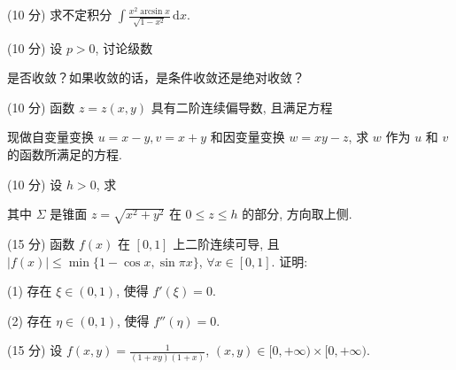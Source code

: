 (10 分) 求不定积分 $\int \frac{x^2 \arcsin x}{\sqrt{1 - x^2}} \, \mathrm{d}x$.\par
\par{}
(10 分) 设 $p > 0$, 讨论级数\par
\nopagebreak[4]
是否收敛？如果收敛的话，是条件收敛还是绝对收敛？\par
\par{}
(10 分) 函数 $z = z(x, y)$ 具有二阶连续偏导数, 且满足方程\par
\nopagebreak[4]
现做自变量变换 $u = x - y, v = x + y$ 和因变量变换 $w = xy - z$, 求 $w$ 作为 $u$ 和 $v$ 的函数所满足的方程.\par
\par{}
(10 分) 设 $h > 0$, 求\par
\nopagebreak[4]
其中 $\Sigma$ 是锥面 $z = \sqrt{x^2 + y^2}$ 在 $0 \leq z \leq h$ 的部分, 方向取上侧.\par
(15 分) 函数 $f(x)$ 在 $[0,1]$ 上二阶连续可导, 且 $|f(x)| \leq \min \{1 - \cos x, \sin \pi x\}$, $\forall x \in [0,1]$. 证明:\par
(1) 存在 $\xi \in (0,1)$, 使得 $f'(\xi) = 0$.\par
(2) 存在 $\eta \in (0,1)$, 使得 $f''(\eta) = 0$.\par
(15 分) 设 $f(x, y) = \frac{1}{(1 + xy)(1 + x)}$, $(x, y) \in [0, +\infty) \times [0, +\infty)$.\par
